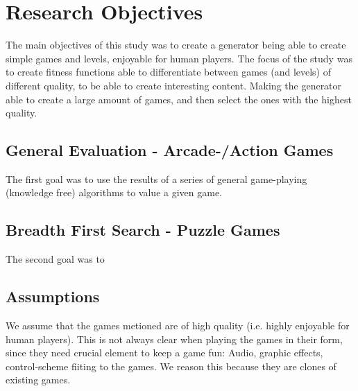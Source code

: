\documentclass[a4paper,titlepage,final, twoside]{report}
\begin{document}
\chapter{Research Objectives}
The main objectives of this study was to create a generator being able to create simple games and levels, enjoyable for human players.
The focus of the study was to create fitness functions able to differentiate between games (and levels) of different quality, to be able to create interesting content. Making the generator able to create a large amount of games, and then select the ones with the highest quality.

\section{General Evaluation - Arcade-/Action Games}
The first goal was to use the results of a series of general game-playing (knowledge free) algorithms to value a given game.

\section{Breadth First Search - Puzzle Games}
The second goal was to 

\section{Assumptions}
We assume that the games metioned are of high quality (i.e. highly enjoyable for human players). This is not always clear when playing the games in their form, since they need crucial element to keep a game fun: Audio, graphic effects, control-scheme fiiting to the games.
We reason this because they are clones of existing games.




\end{document}
